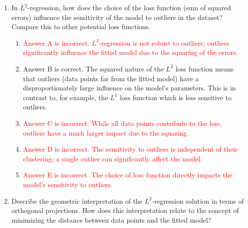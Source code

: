 \documentclass{article}%
\newcommand{\incorrect}[1]{\textcolor{red}{#1}}
\begin{document}
\begin{enumerate}
\begin{enumerate}
\item \incorrect{Answer C is incorrect. The normal equations are a set of linear equations, not inequalities. They represent the conditions for the minimum of the error function.}%
\item \incorrect{Answer D is incorrect. The normal equations are derived from the gradient, not the Hessian matrix. The Hessian would be relevant for analyzing the curvature of the error surface, but not directly for finding the solution.}%
\item \incorrect{Answer E is incorrect. The normal equations are primarily used for linear and polynomial regression problems, providing an exact solution (in the linear case).}%
\end{enumerate}%
\vspace{1em}%
\item In $L^2$-regression, how does the choice of the loss function (sum of squared errors) influence the sensitivity of the model to outliers in the dataset?  Compare this to other potential loss functions.%
\begin{enumerate}%
\item \incorrect{Answer A is incorrect.  $L^2$-regression is not robust to outliers; outliers significantly influence the fitted model due to the squaring of the errors.}%
\item Answer B is correct.  The squared nature of the $L^2$ loss function means that outliers (data points far from the fitted model) have a disproportionately large influence on the model's parameters.  This is in contrast to, for example, the $L^1$ loss function which is less sensitive to outliers.%
\item \incorrect{Answer C is incorrect. While all data points contribute to the loss, outliers have a much larger impact due to the squaring.}%
\item \incorrect{Answer D is incorrect. The sensitivity to outliers is independent of their clustering; a single outlier can significantly affect the model.}%
\item \incorrect{Answer E is incorrect. The choice of loss function directly impacts the model's sensitivity to outliers.}%
\end{enumerate}%
\vspace{1em}%
\item Describe the geometric interpretation of the $L^2$-regression solution in terms of orthogonal projections. How does this interpretation relate to the concept of minimizing the distance between data points and the fitted model?%

\end{enumerate}
\end{document}
